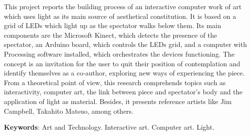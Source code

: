 
\begin{ABSTRACT}
	\begin{SingleSpace}
	
		\hspace{-1.3 cm}
		This project reports the building process of an interactive computer work of art which uses light as its main source of aesthetical constitution. It is based on a grid of LEDs which light up as the spectator walks below them. Its main components are the Microsoft Kinect, which detects the presence of the spectator, an Arduino board, which controls the LEDs grid, and a computer with Processing software installed, which orchestrates the devices functioning. The concept is an invitation for the user to quit their position of contemplation and identify themselves as a co-author, exploring new ways of experiencing the piece. From a theoretical point of view, this research comprehends topics such as interactivity, computer art, the link between piece and spectator's body and the application of light as material. Besides, it presents reference artists like Jim Campbell, Takahito Matsuo, among others.
		

		\vspace*{0.5cm}\hspace{-1.3 cm}\textbf{Keywords}: Art and Technology. Interactive art. Computer art. Light.
		
		
	\end{SingleSpace}

\end{ABSTRACT}
